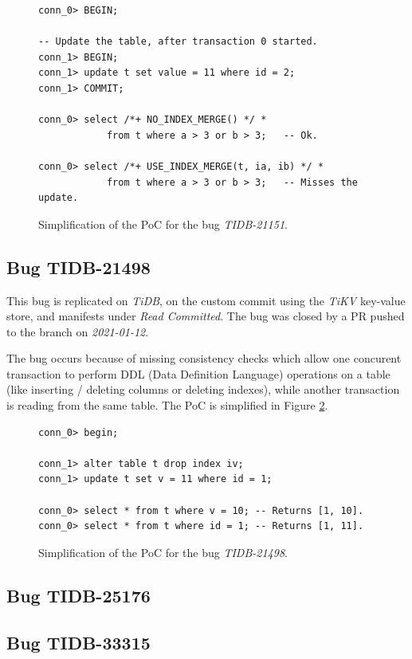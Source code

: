 \begin{figure}
\begin{verbatim}
conn_0> BEGIN;

-- Update the table, after transaction 0 started.
conn_1> BEGIN;
conn_1> update t set value = 11 where id = 2;
conn_1> COMMIT;

conn_0> select /*+ NO_INDEX_MERGE() */ *
            from t where a > 3 or b > 3;   -- Ok.

conn_0> select /*+ USE_INDEX_MERGE(t, ia, ib) */ *
            from t where a > 3 or b > 3;   -- Misses the update.
\end{verbatim}
\caption{Simplification of the PoC for the bug \textit{TIDB-21151}.} \label{fig:TIDB-21151}
\end{figure}

\subsection*{Bug TIDB-21498}

This bug is replicated on \textit{TiDB}, on the custom commit  using the \textit{TiKV} key-value store, and manifests under \textit{Read Committed}. The bug was closed by a PR pushed to the  branch on \textit{2021-01-12}.

The bug occurs because of missing consistency checks which allow one concurent transaction to perform DDL (Data Definition Language) operations on a table (like inserting / deleting columns or deleting indexes), while another transaction is reading from the same table. The PoC is simplified in Figure \ref{fig:TIDB-21498}.

\begin{figure}
\begin{verbatim}
conn_0> begin;

conn_1> alter table t drop index iv;
conn_1> update t set v = 11 where id = 1;

conn_0> select * from t where v = 10; -- Returns [1, 10].
conn_0> select * from t where id = 1; -- Returns [1, 11].
\end{verbatim}
\caption{Simplification of the PoC for the bug \textit{TIDB-21498}.} \label{fig:TIDB-21498}
\end{figure}

\subsection*{Bug TIDB-25176}
\subsection*{Bug TIDB-33315}

